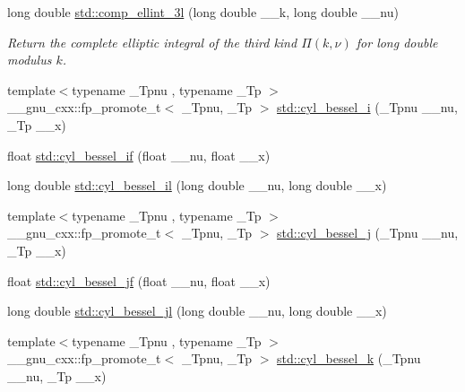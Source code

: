 \begin{DoxyCompactItemize}
long double \hyperlink{group__tr29124__math__spec__func_ga1ca081fee102cd0d4d6b091285e495e5}{std\+::comp\+\_\+ellint\+\_\+3l} (long double \+\_\+\+\_\+k, long double \+\_\+\+\_\+nu)
\begin{DoxyCompactList}\small\item\em Return the complete elliptic integral of the third kind $ \Pi(k,\nu) $ for {\ttfamily long double} modulus $ k $. \end{DoxyCompactList}\item 
{\footnotesize template$<$typename \+\_\+\+Tpnu , typename \+\_\+\+Tp $>$ }\\\+\_\+\+\_\+gnu\+\_\+cxx\+::fp\+\_\+promote\+\_\+t$<$ \+\_\+\+Tpnu, \+\_\+\+Tp $>$ \hyperlink{group__tr29124__math__spec__func_ga29504b6008798072b0b8d6ea5a50ec60}{std\+::cyl\+\_\+bessel\+\_\+i} (\+\_\+\+Tpnu \+\_\+\+\_\+nu, \+\_\+\+Tp \+\_\+\+\_\+x)
\item 
float \hyperlink{group__tr29124__math__spec__func_gaaf738427d4da0bda66bc2274dfb853a7}{std\+::cyl\+\_\+bessel\+\_\+if} (float \+\_\+\+\_\+nu, float \+\_\+\+\_\+x)
\item 
long double \hyperlink{group__tr29124__math__spec__func_gab7962629216d03efb8ecaa3f70c6878f}{std\+::cyl\+\_\+bessel\+\_\+il} (long double \+\_\+\+\_\+nu, long double \+\_\+\+\_\+x)
\item 
{\footnotesize template$<$typename \+\_\+\+Tpnu , typename \+\_\+\+Tp $>$ }\\\+\_\+\+\_\+gnu\+\_\+cxx\+::fp\+\_\+promote\+\_\+t$<$ \+\_\+\+Tpnu, \+\_\+\+Tp $>$ \hyperlink{group__tr29124__math__spec__func_ga644f7eb975809674db88768f2f115744}{std\+::cyl\+\_\+bessel\+\_\+j} (\+\_\+\+Tpnu \+\_\+\+\_\+nu, \+\_\+\+Tp \+\_\+\+\_\+x)
\item 
float \hyperlink{group__tr29124__math__spec__func_ga15731a7bccd6351d28353e3c4c2a2d23}{std\+::cyl\+\_\+bessel\+\_\+jf} (float \+\_\+\+\_\+nu, float \+\_\+\+\_\+x)
\item 
long double \hyperlink{group__tr29124__math__spec__func_gade8e94a80520a8b628b2d658755b25c0}{std\+::cyl\+\_\+bessel\+\_\+jl} (long double \+\_\+\+\_\+nu, long double \+\_\+\+\_\+x)
\item 
{\footnotesize template$<$typename \+\_\+\+Tpnu , typename \+\_\+\+Tp $>$ }\\\+\_\+\+\_\+gnu\+\_\+cxx\+::fp\+\_\+promote\+\_\+t$<$ \+\_\+\+Tpnu, \+\_\+\+Tp $>$ \hyperlink{group__tr29124__math__spec__func_gac73d664b8e7ceba7f8e786c93e97a084}{std\+::cyl\+\_\+bessel\+\_\+k} (\+\_\+\+Tpnu \+\_\+\+\_\+nu, \+\_\+\+Tp \+\_\+\+\_\+x)
\item 

\end{DoxyCompactItemize}
